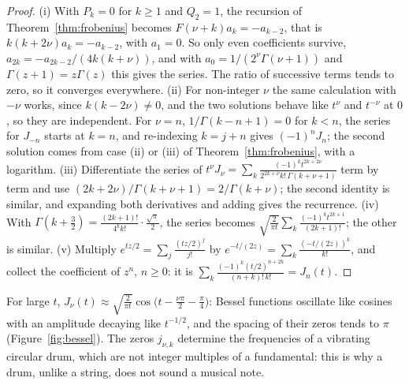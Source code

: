 \documentclass[11pt,a4paper]{article}
\numberwithin{equation}{section}
\theoremstyle{definition}
\begin{document}
\begin{proof}
(i) With $P_k = 0$ for $k \geq 1$ and $Q_2 = 1$, the recursion of Theorem~\ref{thm:frobenius} becomes $F(\nu + k)a_k = -a_{k-2}$, that is $k(k + 2\nu)a_k = -a_{k-2}$, with $a_1 = 0$. So only even coefficients survive,
$a_{2k} = -a_{2k-2}/(4k(k + \nu))$, and with $a_0 = 1/(2^\nu\Gamma(\nu + 1))$ and $\Gamma(z + 1) = z\Gamma(z)$ this gives the series. The ratio of successive terms tends to zero, so it converges everywhere.
(ii) For non-integer $\nu$ the same calculation with $-\nu$ works, since $k(k - 2\nu) \neq 0$, and the two solutions behave like $t^\nu$ and $t^{-\nu}$ at $0$, so they are independent. For $\nu = n$, $1/\Gamma(k - n + 1) = 0$ for
$k < n$, the series for $J_{-n}$ starts at $k = n$, and re-indexing $k = j + n$ gives $(-1)^nJ_n$; the second solution comes from case (ii) or (iii) of Theorem~\ref{thm:frobenius}, with a logarithm.
(iii) Differentiate the series of $t^\nu J_\nu = \sum_k\frac{(-1)^kt^{2k+2\nu}}{2^{2k+\nu}k!\,\Gamma(k + \nu + 1)}$ term by term and use $(2k + 2\nu)/\Gamma(k + \nu + 1) = 2/\Gamma(k + \nu)$; the second identity is similar, and expanding
both derivatives and adding gives the recurrence. (iv) With $\Gamma(k + \frac32) = \frac{(2k + 1)!}{4^kk!}\cdot\frac{\sqrt\pi}{2}$, the series becomes $\sqrt{\frac2{\pi t}}\sum_k\frac{(-1)^kt^{2k+1}}{(2k + 1)!}$; the other is similar. (v) Multiply
$e^{tz/2} = \sum_j\frac{(tz/2)^j}{j!}$ by $e^{-t/(2z)} = \sum_k\frac{(-t/(2z))^k}{k!}$, and collect the coefficient of $z^n$, $n \geq 0$: it is $\sum_k\frac{(-1)^k(t/2)^{n+2k}}{(n + k)!\,k!} = J_n(t)$.
\end{proof}

For large $t$, $J_\nu(t) \approx \sqrt{\frac{2}{\pi t}}\cos\bigl(t - \frac{\nu\pi}2 - \frac\pi4\bigr)$: Bessel functions oscillate like cosines with an amplitude decaying like $t^{-1/2}$, and the spacing of their zeros tends to $\pi$
(Figure~\ref{fig:bessel}). The zeros $j_{\nu,k}$ determine the frequencies of a vibrating circular drum, which are not integer multiples of a fundamental: this is why a drum, unlike a string, does not
sound a musical note.
\end{document}
